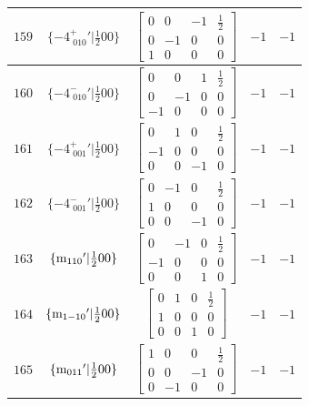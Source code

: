 \documentclass[fleqn,8pt]{jsarticle}
\begin{document}
\begin{longtable}{ccccc}
$ 159 $ & $ \{-4^{+}_{\,\,010}{}'|\frac{1}{2} 0 0\} $ & $ \begin{bmatrix} 0 & 0 & -1 & \frac{1}{2} \\ 0 & -1 & 0 & 0 \\ 1 & 0 & 0 & 0 \end{bmatrix} $ & $ -1 $ & $ -1 $ \\ \hline
$ 160 $ & $ \{-4^{-}_{\,\,010}{}'|\frac{1}{2} 0 0\} $ & $ \begin{bmatrix} 0 & 0 & 1 & \frac{1}{2} \\ 0 & -1 & 0 & 0 \\ -1 & 0 & 0 & 0 \end{bmatrix} $ & $ -1 $ & $ -1 $ \\ \hline
$ 161 $ & $ \{-4^{+}_{\,\,001}{}'|\frac{1}{2} 0 0\} $ & $ \begin{bmatrix} 0 & 1 & 0 & \frac{1}{2} \\ -1 & 0 & 0 & 0 \\ 0 & 0 & -1 & 0 \end{bmatrix} $ & $ -1 $ & $ -1 $ \\ \hline
$ 162 $ & $ \{-4^{-}_{\,\,001}{}'|\frac{1}{2} 0 0\} $ & $ \begin{bmatrix} 0 & -1 & 0 & \frac{1}{2} \\ 1 & 0 & 0 & 0 \\ 0 & 0 & -1 & 0 \end{bmatrix} $ & $ -1 $ & $ -1 $ \\ \hline
$ 163 $ & $ \{{\rm m}_{110}{}'|\frac{1}{2} 0 0\} $ & $ \begin{bmatrix} 0 & -1 & 0 & \frac{1}{2} \\ -1 & 0 & 0 & 0 \\ 0 & 0 & 1 & 0 \end{bmatrix} $ & $ -1 $ & $ -1 $ \\ \hline
$ 164 $ & $ \{{\rm m}_{1-10}{}'|\frac{1}{2} 0 0\} $ & $ \begin{bmatrix} 0 & 1 & 0 & \frac{1}{2} \\ 1 & 0 & 0 & 0 \\ 0 & 0 & 1 & 0 \end{bmatrix} $ & $ -1 $ & $ -1 $ \\ \hline
$ 165 $ & $ \{{\rm m}_{011}{}'|\frac{1}{2} 0 0\} $ & $ \begin{bmatrix} 1 & 0 & 0 & \frac{1}{2} \\ 0 & 0 & -1 & 0 \\ 0 & -1 & 0 & 0 \end{bmatrix} $ & $ -1 $ & $ -1 $ \\ \hline

\end{longtable}
\end{document}
